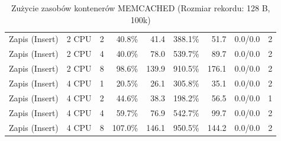 \begin{table}[ht]
{\begin{tabular}{llcrrrrcc}
Zapis (Insert) & 2 CPU & 2 & 40.8\% & 41.4 & 388.1\% & 51.7 & 0.0/0.0 & 2 \\
Zapis (Insert) & 2 CPU & 4 & 40.0\% & 78.0 & 539.7\% & 89.7 & 0.0/0.0 & 2 \\
Zapis (Insert) & 2 CPU & 8 & 98.6\% & 139.9 & 910.5\% & 176.1 & 0.0/0.0 & 2 \\
Zapis (Insert) & 4 CPU & 1 & 20.5\% & 26.1 & 305.8\% & 35.1 & 0.0/0.0 & 2 \\
Zapis (Insert) & 4 CPU & 2 & 44.6\% & 38.3 & 198.2\% & 56.5 & 0.0/0.0 & 1 \\
Zapis (Insert) & 4 CPU & 4 & 59.7\% & 76.9 & 542.7\% & 99.7 & 0.0/0.0 & 2 \\
Zapis (Insert) & 4 CPU & 8 & 107.0\% & 146.1 & 950.5\% & 144.2 & 0.0/0.0 & 2 \\
\bottomrule
\end{tabular}%
}
\caption{Zużycie zasobów kontenerów MEMCACHED (Rozmiar rekordu: 128 B, 100k)}
\label{tab:resources_memcached_small_100000}
\end{table}
